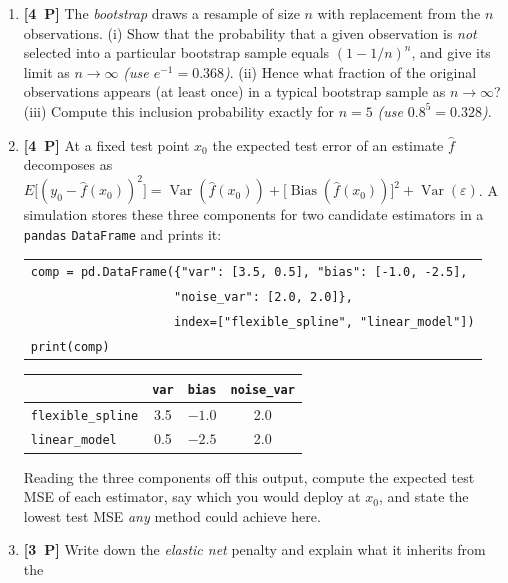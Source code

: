 \documentclass[11pt,a4paper]{article}
\newcommand{\pp}[1]{\textbf{[#1~P]}\enspace}
\begin{document}
\begin{enumerate}[label=(\alph*),leftmargin=7mm,itemsep=2.5mm]
  \item \pp{4} The \emph{bootstrap} draws a resample of size $n$ with replacement from the $n$
    observations. (i) Show that the probability that a given observation is \emph{not} selected
    into a particular bootstrap sample equals $(1-1/n)^n$, and give its limit as $n\to\infty$
    \emph{(use $e^{-1}=0.368$)}. (ii) Hence what fraction of the original observations appears
    (at least once) in a typical bootstrap sample as $n\to\infty$? (iii) Compute this inclusion
    probability exactly for $n=5$ \emph{(use $0.8^{5}=0.328$)}.
  \item \pp{4} At a fixed test point $x_0$ the expected test error of an estimate $\hat f$
    decomposes as
    $E\bigl[(y_0-\hat f(x_0))^2\bigr]
      =\operatorname{Var}(\hat f(x_0))+\bigl[\operatorname{Bias}(\hat f(x_0))\bigr]^2
       +\operatorname{Var}(\varepsilon)$.
    A simulation stores these three components for two candidate estimators in a \texttt{pandas}
    \texttt{DataFrame} and prints it:
    \begin{center}\small
    \begin{tabular}{@{}l@{}}
    \texttt{comp = pd.DataFrame(\{"var": [3.5, 0.5], "bias": [-1.0, -2.5],}\\
    \texttt{~~~~~~~~~~~~~~~~~~~~"noise\_var": [2.0, 2.0]\},}\\
    \texttt{~~~~~~~~~~~~~~~~~~~~index=["flexible\_spline", "linear\_model"])}\\
    \texttt{print(comp)}\\
    \end{tabular}
    \end{center}
    \begin{center}
    \begin{tabular}{lccc}
    \toprule
     & \texttt{var} & \texttt{bias} & \texttt{noise\_var}\\
    \midrule
    \texttt{flexible\_spline} & 3.5 & $-1.0$ & 2.0\\
    \texttt{linear\_model} & 0.5 & $-2.5$ & 2.0\\
    \bottomrule
    \end{tabular}
    \end{center}
    Reading the three components off this output, compute the expected test MSE of each estimator,
    say which you would deploy at $x_0$, and state the lowest test MSE \emph{any} method could
    achieve here.
  \item \pp{3} Write down the \emph{elastic net} penalty and explain what it inherits from the

\end{enumerate}
\end{document}
